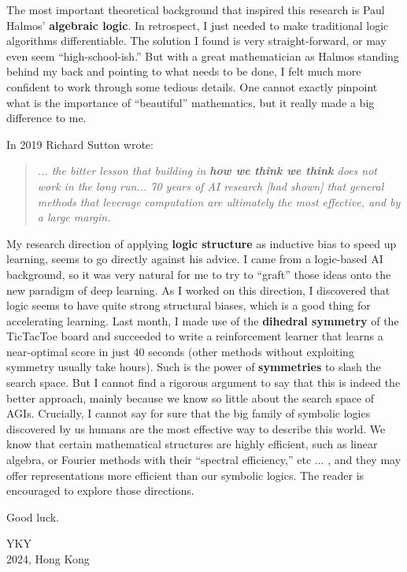 \begin{preface}
The most important theoretical background that inspired this research is Paul Halmos' \textbf{algebraic logic}.  In retrospect, I just needed to make traditional logic algorithms differentiable.  The solution I found is very straight-forward, or may even seem ``high-school-ish.''  But with a great mathematician as Halmos standing behind my back and pointing to what needs to be done, I felt much more confident to work through some tedious details.  One cannot exactly pinpoint what is the importance of ``beautiful'' mathematics, but it really made a big difference to me.

In 2019 Richard Sutton wrote:
\begin{quotation}
	\textit{... the bitter lesson that building in \textbf{how we think we think} does not work in the long run... 70 years of AI research [had shown] that general methods that leverage computation are ultimately the most effective, and by a large margin.}
\end{quotation}
My research direction of applying \textbf{logic structure} as inductive bias to speed up learning, seems to go directly against his advice.  I came from a logic-based AI background, so it was very natural for me to try to ``graft'' those ideas onto the new paradigm of deep learning.  As I worked on this direction, I discovered that logic seems to have quite strong structural biases, which is a good thing for accelerating learning.  Last month, I made use of the \textbf{dihedral symmetry} of the TicTacToe board and succeeded to write a reinforcement learner that learns a near-optimal score in just 40 seconds (other methods without exploiting symmetry usually take hours).  Such is the power of \textbf{symmetries} to slash the search space.  But I cannot find a rigorous argument to say that this is indeed the better approach, mainly because we know so little about the search space of AGIs.  Crucially, I cannot say for sure that the big family of symbolic logics discovered by us humans are the most effective way to describe this world.  We know that certain mathematical structures are highly efficient, such as linear algebra, or Fourier methods with their ``spectral efficiency,'' etc ... , and they may offer representations more efficient than our symbolic logics.  The reader is encouraged to explore those directions.

Good luck.

\begin{flushright}
YKY\\
2024, Hong Kong
\end{flushright}

\end{preface}
